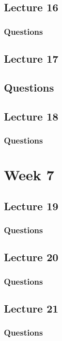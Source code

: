 \documentclass{report}
\begin{document}
\section{Lecture 16}
\subsection*{Questions}
\qs{}{}

\newpage
\section{Lecture 17}
\section*{Questions}
\qs{}{}

\newpage
\section{Lecture 18}
\subsection*{Questions}
\qs{}{}

\chapter{Week 7}
\section{Lecture 19}
\subsection*{Questions}
\qs{}{}

\newpage
\section{Lecture 20}
\subsection*{Questions}
\qs{}{}

\newpage
\section{Lecture 21}
\subsection*{Questions}
\qs{}{}
\end{document}

